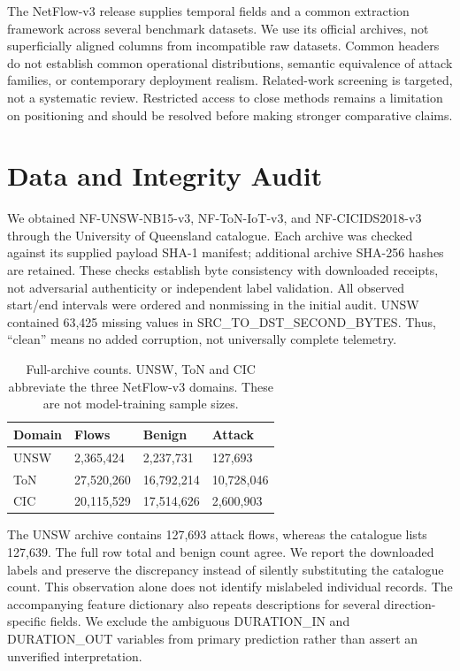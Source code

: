 \documentclass[manuscript,screen,nonacm]{acmart}
\begin{document}
The NetFlow-v3 release supplies temporal fields and a common extraction framework across several benchmark datasets\cite{temporal}. We use its official archives, not superficially aligned columns from incompatible raw datasets. Common headers do not establish common operational distributions, semantic equivalence of attack families, or contemporary deployment realism. Related-work screening is targeted, not a systematic review. Restricted access to close methods remains a limitation on positioning and should be resolved before making stronger comparative claims.

\section{Data and Integrity Audit}
We obtained NF-UNSW-NB15-v3, NF-ToN-IoT-v3, and NF-CICIDS2018-v3 through the University of Queensland catalogue\cite{catalogue}. Each archive was checked against its supplied payload SHA-1 manifest; additional archive SHA-256 hashes are retained. These checks establish byte consistency with downloaded receipts, not adversarial authenticity or independent label validation. All observed start/end intervals were ordered and nonmissing in the initial audit. UNSW contained 63,425 missing values in SRC\_TO\_DST\_SECOND\_BYTES. Thus, ``clean'' means no added corruption, not universally complete telemetry.

\begin{table}[t]
\centering
\caption{Full-archive counts. UNSW, ToN and CIC abbreviate the three NetFlow-v3 domains. These are not model-training sample sizes.}
\begin{tabular}{llll}
\toprule
Domain & Flows & Benign & Attack \\
\midrule
UNSW & 2,365,424 & 2,237,731 & 127,693 \\
ToN & 27,520,260 & 16,792,214 & 10,728,046 \\
CIC & 20,115,529 & 17,514,626 & 2,600,903 \\
\bottomrule
\end{tabular}
\end{table}

The UNSW archive contains 127,693 attack flows, whereas the catalogue lists 127,639. The full row total and benign count agree. We report the downloaded labels and preserve the discrepancy instead of silently substituting the catalogue count. This observation alone does not identify mislabeled individual records. The accompanying feature dictionary also repeats descriptions for several direction-specific fields. We exclude the ambiguous DURATION\_IN and DURATION\_OUT variables from primary prediction rather than assert an unverified interpretation.
\end{document}
